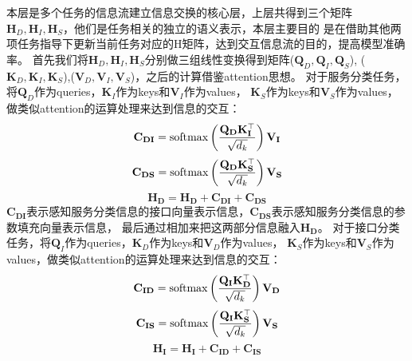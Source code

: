 本层是多个任务的信息流建立信息交换的核心层，上层共得到三个矩阵$\mathbf{H}_{D},\mathbf{H}_{I},\mathbf{H}_{S}$，他们是任务相关的独立的语义表示，本层主要目的
是在借助其他两项任务指导下更新当前任务对应的H矩阵，达到交互信息流的目的，提高模型准确率。
首先我们将$\mathbf{H}_{D},\mathbf{H}_{I},\mathbf{H}_{S}$分别做三组线性变换得到矩阵($\mathbf{Q}_{D},\mathbf{Q}_{I},\mathbf{Q}_{S}$),
($\mathbf{K}_{D},\mathbf{K}_{I},\mathbf{K}_{S}$),($\mathbf{V}_{D},\mathbf{V}_{I},\mathbf{V}_{S}$)，之后的计算借鉴attention思想。
对于服务分类任务，将$\mathbf{Q}_{D}$作为queries，$\mathbf{K}_{I}$作为keys和$\mathbf{V}_{I}$作为values，
$\mathbf{K}_{S}$作为keys和$\mathbf{V}_{S}$作为values，做类似attention的运算处理来达到信息的交互：
\begin{equation}
  \mathbf{C}_{\mathbf{DI}}=\operatorname{softmax}\left(\frac{\mathbf{Q}_{\mathbf{D}} \mathbf{K}_{\mathbf{I}}^{\top}}{\sqrt{d_{k}}}\right) \mathbf{V}_{\mathbf{I}}\\
\end{equation}
\begin{equation}  
\mathbf{C}_{\mathbf{DS}}=\operatorname{softmax}\left(\frac{\mathbf{Q}_{\mathbf{D}} \mathbf{K}_{\mathbf{S}}^{\top}}{\sqrt{d_{k}}}\right) \mathbf{V}_{\mathbf{S}}\\
\end{equation}
\begin{equation}  
\mathbf{H}_\mathbf{D}=\mathbf{H}_\mathbf{D}+\mathbf{C}_{\mathbf{DI}}+\mathbf{C}_{\mathbf{DS}}
\end{equation}
$\mathbf{C}_{\mathbf{DI}}$表示感知服务分类信息的接口向量表示信息，$\mathbf{C}_{\mathbf{DS}}$表示感知服务分类信息的参数填充向量表示信息，
最后通过相加来把这两部分信息融入$\mathbf{H}_\mathbf{D}$。
对于接口分类任务，将$\mathbf{Q}_{I}$作为queries，$\mathbf{K}_{D}$作为keys和$\mathbf{V}_{D}$作为values，
$\mathbf{K}_{S}$作为keys和$\mathbf{V}_{S}$作为values，做类似attention的运算处理来达到信息的交互：
\begin{equation}
  \mathbf{C}_{\mathbf{ID}}=\operatorname{softmax}\left(\frac{\mathbf{Q}_{\mathbf{I}} \mathbf{K}_{\mathbf{D}}^{\top}}{\sqrt{d_{k}}}\right) \mathbf{V}_{\mathbf{D}}\\
\end{equation}
\begin{equation}
  \mathbf{C}_{\mathbf{IS}}=\operatorname{softmax}\left(\frac{\mathbf{Q}_{\mathbf{I}} \mathbf{K}_{\mathbf{S}}^{\top}}{\sqrt{d_{k}}}\right) \mathbf{V}_{\mathbf{S}}\\
\end{equation}
\begin{equation}
  \mathbf{H}_\mathbf{I}=\mathbf{H}_\mathbf{I}+\mathbf{C}_{\mathbf{ID}}+\mathbf{C}_{\mathbf{IS}}
\end{equation}
